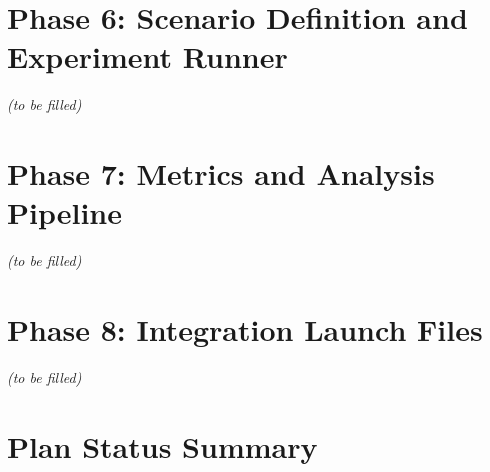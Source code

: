 \documentclass[11pt]{article}
\begin{document}
\newpage
\section{Phase 6: Scenario Definition and Experiment Runner}
\textit{(to be filled)}

\newpage
\section{Phase 7: Metrics and Analysis Pipeline}
\textit{(to be filled)}

\newpage
\section{Phase 8: Integration Launch Files}
\textit{(to be filled)}

\newpage
\section{Plan Status Summary}
\end{document}
